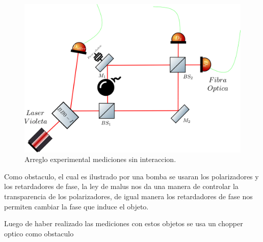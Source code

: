 \documentclass[11pt]{article}
\begin{document}
\begin{figure}[H]
\centering
\includegraphics[scale=0.5]{images/machzehnder_single_es_b.png}
\caption{Arreglo experimental mediciones sin interaccion.}
\label{fig:SPDC5}
\end{figure}

Como obstaculo, el cual es ilustrado por una bomba se usaran los polarizadores y los retardadores de fase, la ley de malus nos da una manera de controlar la transparencia de los polarizadores, de igual manera los retardadores de fase nos permiten cambiar la fase que induce el objeto.

Luego de haber realizado las mediciones con estos objetos se usa un chopper optico como obstaculo




\end{document}
